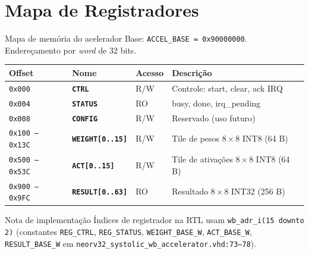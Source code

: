 \documentclass[aspectratio=169,10pt]{beamer}
\newcommand{\regname}[1]{\textbf{\texttt{#1}}}
\begin{document}
\section{Mapa de Registradores}

\begin{frame}{Mapa de memória do acelerador}
  \small
  Base: \texttt{ACCEL\_BASE = 0x90000000}. Endereçamento por \emph{word} de 32 bits.
  \vspace{0.5em}

  \begin{tabular}{lllp{5.2cm}}
    \toprule
    \textbf{Offset} & \textbf{Nome} & \textbf{Acesso} & \textbf{Descrição} \\
    \midrule
    \texttt{0x000} & \regname{CTRL}   & R/W & Controle: start, clear, ack IRQ \\
    \texttt{0x004} & \regname{STATUS} & RO  & busy, done, irq\_pending \\
    \texttt{0x008} & \regname{CONFIG} & R/W & Reservado (uso futuro) \\
    \texttt{0x100 -- 0x13C} & \regname{WEIGHT[0..15]} & R/W & Tile de pesos $8\times8$ INT8 (64 B) \\
    \texttt{0x500 -- 0x53C} & \regname{ACT[0..15]}    & R/W & Tile de ativações $8\times8$ INT8 (64 B) \\
    \texttt{0x900 -- 0x9FC} & \regname{RESULT[0..63]} & RO  & Resultado $8\times8$ INT32 (256 B) \\
    \bottomrule
  \end{tabular}

  \vspace{1em}
  \begin{alertblock}{Nota de implementação}
    Índices de registrador na RTL usam \texttt{wb\_adr\_i(15 downto 2)}
    (constantes \texttt{REG\_CTRL}, \texttt{REG\_STATUS}, \texttt{WEIGHT\_BASE\_W},
    \texttt{ACT\_BASE\_W}, \texttt{RESULT\_BASE\_W} em
    \texttt{neorv32\_systolic\_wb\_accelerator.vhd:73--78}).
  \end{alertblock}
\end{frame}
\end{document}
